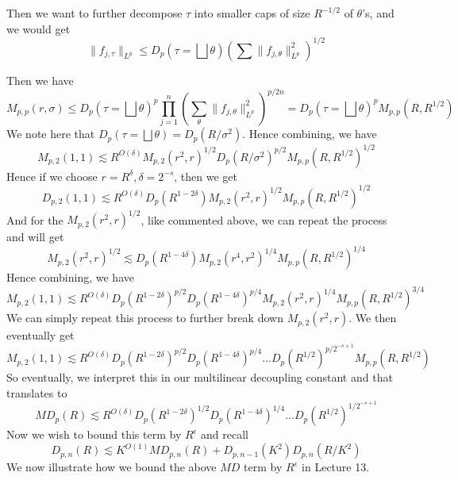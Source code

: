 Then we want to further decompose $\tau$ into smaller caps of size $R^{-1/2}$ of $\theta$'s, and we would get
\begin{equation*}
    \|f_{j,\tau}\|_{L^p}\leq D_p(\tau=\bigsqcup\theta)\left(\sum\|f_{j,\theta}\|_{L^p}^2 \right)^{1/2}
\end{equation*}

Then we have
\begin{equation*}
    M_{p,p}(r,\sigma)\leq D_p(\tau=\bigsqcup\theta)^p\prod_{j=1}^n\left(\sum_{\theta}\|f_{j,\theta}\|_{L^p}^2 \right)^{p/2n}=D_p(\tau=\bigsqcup\theta)^pM_{p,p}(R,R^{1/2})
\end{equation*}
We note here that $D_p(\tau=\bigsqcup\theta)=D_p(R/\sigma^2)$.
Hence combining, we have
\begin{equation*}
    M_{p,2}(1,1)\lesssim R^{O(\delta)}M_{p,2}(r^2,r)^{1/2}D_p(R/\sigma^2)^{p/2}M_{p,p}(R,R^{1/2})^{1/2}
\end{equation*}
Hence if we choose $r=R^\delta, \delta=2^{-s}$, then we get
\begin{equation*}
    D_{p,2}(1,1)\lesssim R^{O(\delta)}D_p(R^{1-2\delta})M_{p,2}(r^2, r)^{1/2}M_{p,p}(R, R^{1/2})^{1/2}
\end{equation*}
And for the $M_{p,2}(r^2, r)^{1/2}$, like commented above, we can repeat the process and will get
\begin{equation*}
    M_{p,2}(r^2, r)^{1/2}\lesssim D_p(R^{1-4\delta})M_{p,2}(r^4, r^2)^{1/4}M_{p,p}(R,R^{1/2})^{1/4}
\end{equation*}
Hence combining, we have
\begin{equation*}
    M_{p,2}(1,1)\lesssim R^{O(\delta)}D_p(R^{1-2\delta})^{p/2}D_p(R^{1-4\delta})^{p/4}M_{p,2}(r^2,r)^{1/4}M_{p,p}(R,R^{1/2})^{3/4}
\end{equation*}
We can simply repeat this process to further break down $M_{p,2}(r^2, r)$. We then eventually get 
\begin{equation*}
    M_{p,2}(1,1)\lesssim R^{O(\delta)}D_p(R^{1-2\delta})^{p/2}D_p(R^{1-4\delta})^{p/4}...D_p(R^{1/2})^{p/2^{-s+1}}M_{p,p}(R,R^{1/2})
\end{equation*}
So eventually, we interpret this in our multilinear decoupling constant and that translates to
\begin{equation*}
    MD_{p}(R)\lesssim R^{O(\delta)}D_p(R^{1-2\delta})^{1/2}D_p(R^{1-4\delta})^{1/4}...D_p(R^{1/2})^{1/2^{-s+1}}
\end{equation*}
Now we wish to bound this term by $R^\epsilon$ and recall
\begin{equation*}
    D_{p,n}(R)\lesssim K^{O(1)}MD_{p,n}(R)+D_{p,n-1}(K^2)D_{p,n}(R/K^2)
\end{equation*}
We now illustrate how we bound the above $MD$ term by $R^\epsilon$ in Lecture 13.
